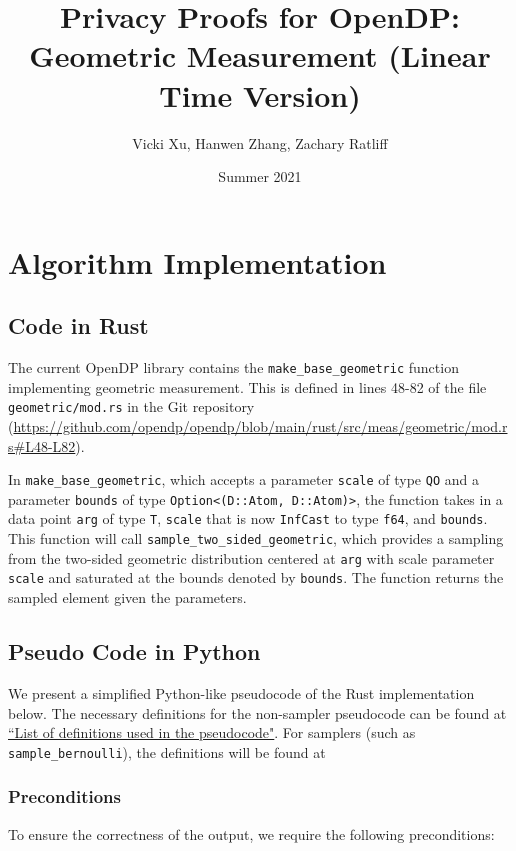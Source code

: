 \documentclass[11pt,a4paper]{article}
\title{Privacy Proofs for OpenDP: Geometric Measurement (Linear Time Version)}
\author{Vicki Xu, Hanwen Zhang, Zachary Ratliff}
\date{Summer 2021}
\newcommand{\vicki}[1]{{ {\color{olive}{(vicki)~#1}}}}
\begin{document}
\maketitle
\tableofcontents

\section{Algorithm Implementation}
\subsection{Code in Rust}
The current OpenDP library contains the \texttt{make\_base\_geometric} function implementing geometric measurement. This is defined in lines 48-82 of the file \texttt{geometric/mod.rs} in the Git repository (\url{https://github.com/opendp/opendp/blob/main/rust/src/meas/geometric/mod.rs#L48-L82}).

\vicki{is this right?} 
In \texttt{make\_base\_geometric}, which accepts a parameter \texttt{scale} of type \texttt{QO} and a parameter \texttt{bounds} of type \texttt{Option<(D::Atom, D::Atom)>}, the function takes in a data point \texttt{arg} of type \texttt{T}, \texttt{scale} that is now \texttt{InfCast} to type \texttt{f64}, and \texttt{bounds}. This function will call \texttt{sample\_two\_sided\_geometric}, which provides a sampling from the two-sided geometric distribution centered at \texttt{arg} with scale parameter \texttt{scale} and saturated at the bounds denoted by \texttt{bounds}. The function returns the sampled element given the parameters. 

\subsection{Pseudo Code in Python}\label{sec:pseudocode}

We present a simplified Python-like pseudocode of the Rust implementation below. The necessary definitions for the non-sampler pseudocode can be found at \href{https://github.com/opendp/whitepapers/blob/pseudocode-defns/pseudocode-defns/pseudocode_defns.pdf}{``List of definitions used in the pseudocode"}. \vicki{fix link} For samplers (such as \texttt{sample\_bernoulli}), the definitions will be found at \vicki{insert link here}

\subsubsection*{Preconditions}
To ensure the correctness of the output, we require the following preconditions:
\end{document}
